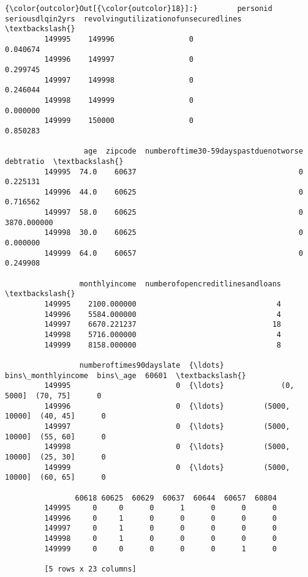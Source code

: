 \documentclass[11pt]{article}
\begin{document}
\begin{Verbatim}[commandchars=\\\{\}]
{\color{outcolor}Out[{\color{outcolor}18}]:}         personid  seriousdlqin2yrs  revolvingutilizationofunsecuredlines  \textbackslash{}
         149995    149996                 0                              0.040674   
         149996    149997                 0                              0.299745   
         149997    149998                 0                              0.246044   
         149998    149999                 0                              0.000000   
         149999    150000                 0                              0.850283   
         
                  age  zipcode  numberoftime30-59dayspastduenotworse    debtratio  \textbackslash{}
         149995  74.0    60637                                     0     0.225131   
         149996  44.0    60625                                     0     0.716562   
         149997  58.0    60625                                     0  3870.000000   
         149998  30.0    60625                                     0     0.000000   
         149999  64.0    60657                                     0     0.249908   
         
                 monthlyincome  numberofopencreditlinesandloans  \textbackslash{}
         149995    2100.000000                                4   
         149996    5584.000000                                4   
         149997    6670.221237                               18   
         149998    5716.000000                                4   
         149999    8158.000000                                8   
         
                 numberoftimes90dayslate  {\ldots}    bins\_monthlyincome  bins\_age  60601  \textbackslash{}
         149995                        0  {\ldots}             (0, 5000]  (70, 75]      0   
         149996                        0  {\ldots}         (5000, 10000]  (40, 45]      0   
         149997                        0  {\ldots}         (5000, 10000]  (55, 60]      0   
         149998                        0  {\ldots}         (5000, 10000]  (25, 30]      0   
         149999                        0  {\ldots}         (5000, 10000]  (60, 65]      0   
         
                60618 60625  60629  60637  60644  60657  60804  
         149995     0     0      0      1      0      0      0  
         149996     0     1      0      0      0      0      0  
         149997     0     1      0      0      0      0      0  
         149998     0     1      0      0      0      0      0  
         149999     0     0      0      0      0      1      0  
         
         [5 rows x 23 columns]
\end{Verbatim}
            
\end{document}
